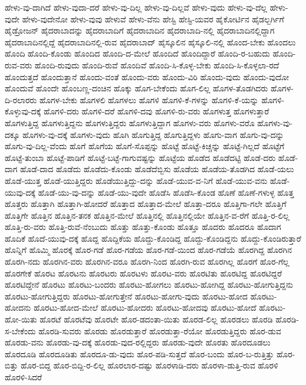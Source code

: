 {ಹೇಳು-ವು-ದಾಗಿದೆ
ಹೇಳು-ವುದಾ-ದರೆ
ಹೇಳು-ವು-ದಿಲ್ಲ
ಹೇಳು-ವು-ದಿಲ್ಲವೆ
ಹೇಳು-ವುದು
ಹೇಳು-ವು-ದೆಲ್ಲ
ಹೇಳು-ವುದೇ
ಹೇಳು-ವುದೇನೋ
ಹೇಳು-ವುವು
ಹೇಳುವೆ
ಹೇಳು-ವೆನು
ಹೇಸ್ಟಿ
ಹೇಸ್ಟಿ-ಯವರ
ಹೈಕೋರ್ಟಿನ
ಹೈಡಲ್ಬರ್ಗಿಗೆ
ಹೈಡ್ರೋಜನ್
ಹೈದರಾಬಾದನ್ನು
ಹೈದರಾಬಾದಿಗೆ
ಹೈದರಾಬಾದಿನ
ಹೈದರಾಬಾದಿ-ನಲ್ಲಿ
ಹೈದರಾಬಾದಿನಲ್ಲಿದ್ದಾಗ
ಹೈದರಾಬಾದಿನಲ್ಲಿದ್ದೆ
ಹೈದರಾಬಾದಿನಲ್ಲಿ-ರುವ
ಹೈದರಾಬಾದ್
ಹೈಸ್ಕೂಲಿನ
ಹೈಸ್ಕೂಲಿ-ನಲ್ಲಿ
ಹೊಂದ-ಬೇಕು
ಹೊಂದಲು
ಹೊಂದಿ
ಹೊಂದಿ-ಕೊಂಡು
ಹೊಂದಿದ
ಹೊಂದಿ-ದ-ಮೇಲೆ
ಹೊಂದಿದೆ
ಹೊಂದಿದ್ದಾರೆ
ಹೊಂದಿ-ರ-ಬಹುದು
ಹೊಂದಿ-ರುವ-ವರು
ಹೊಂದಿ-ರುವುದು
ಹೊಂದಿ-ರುವೆ
ಹೊಂದಿವೆ
ಹೊಂದಿ-ಸಿ-ಕೊಳ್ಳ-ಬೇಕು
ಹೊಂದಿ-ಸಿ-ಕೊಳ್ಳಲಾ-ರದೆ
ಹೊಂದುತ್ತದೆ
ಹೊಂದುತ್ತಾನೆ
ಹೊಂದು-ವಂತೆ
ಹೊಂದು-ವರು
ಹೊಂದು-ವಿರಿ
ಹೊಂದು-ವುದು
ಹೊಂದು-ವುದೋ
ಹೊಂದುವೆ
ಹೊಂದೇ
ಹೊಂಬಣ್ಣ-ದಂಚಿನ
ಹೊಕ್ಕು
ಹೊಗ-ಬೇಕೆಂದು
ಹೊಗ-ಲಿಲ್ಲ
ಹೊಗಳ-ತೊಡಗಿದರು
ಹೊಗಳ-ದಿ-ರಲಾರರು
ಹೊಗಳ-ಬೇಕು
ಹೊಗಳಲಿ
ಹೊಗಳಲು
ಹೊಗಳಿ
ಹೊಗಳಿ-ಕೆ-ಗಳನ್ನು
ಹೊಗಳಿ-ಕೆ-ಯನ್ನು
ಹೊಗಳಿ-ಕೊಳ್ಳುವು-ದಕ್ಕೆ
ಹೊಗಳಿ-ದರು
ಹೊಗಳಿ-ದರೆ
ಹೊಗಳಿ-ದವು
ಹೊಗಳಿ-ರು-ವರು
ಹೊಗಳುತ್ತ
ಹೊಗಳುತ್ತಾರೆ
ಹೊಗಳುತ್ತಿದ್ದ
ಹೊಗಳುತ್ತಿದ್ದನು
ಹೊಗಳುತ್ತಿದ್ದರು
ಹೊಗಳುತ್ತಿದ್ದಾಗ
ಹೊಗಳು-ವರು
ಹೊಗಳು-ವರೊ
ಹೊಗಳು-ವು-ದಕ್ಕೂ
ಹೊಗಳು-ವು-ದಕ್ಕೆ
ಹೊಗಳು-ವುದು
ಹೊಗಿ
ಹೊಗುತ್ತಿದ್ದ
ಹೊಗುತ್ತಿದ್ದಳು
ಹೊಗು-ವಾಗ
ಹೊಗು-ವು-ದನ್ನು
ಹೊಗು-ವು-ದಿಲ್ಲ-ವೆಂದು
ಹೊಗೆ
ಹೊಗೆಯ
ಹೊಗೆ-ಸೊಪ್ಪನ್ನು
ಹೊಟ್ಟೆ
ಹೊಟ್ಟೆ-ಕಿಚ್ಚನ್ನು
ಹೊಟ್ಟೆ-ಗಿಲ್ಲದೆ
ಹೊಟ್ಟೆಗೆ
ಹೊಟ್ಟೆ-ತುಂಬಾ
ಹೊಟ್ಟೆ-ಪಾಡಿಗೆ
ಹೊಟ್ಟೆ-ಬಟ್ಟೆ-ಗಾಗುವಷ್ಟನ್ನು
ಹೊಟ್ಟೆಯ
ಹೊಡೆದ
ಹೊಡೆದಟ್ಟಿ
ಹೊಡೆ-ದರು
ಹೊಡೆ-ದಾಗ
ಹೊಡೆ-ದಾದ
ಹೊಡೆದು
ಹೊಡೆದು-ಕೊಂಡು
ಹೊಡೆದೆಬ್ಬಿಸು
ಹೊಡೆಯ
ಹೊಡೆಯ-ತೊಡಗಿದ
ಹೊಡೆ-ಯಲು
ಹೊಡೆ-ಯುತ್ತ
ಹೊಡೆ-ಯುತ್ತಿದ್ದರು
ಹೊಡೆಯುತ್ತಿದ್ದು-ದನ್ನು
ಹೊಡೆ-ಯುವ-ವ-ನಿಗೆ
ಹೊಡೆ-ಯುವ-ವನು
ಹೊಡೆ-ಯುವು-ದಕ್ಕೆ
ಹೊಡೆ-ಯು-ವು-ದನ್ನು
ಹೊಡೆ-ಯು-ವುದೇ
ಹೊಡೆಸಿ
ಹೊಡೆಸಿ-ಕೊಂಡ
ಹೊಣೆ
ಹೊಣೆ-ಗಳುಳ್ಳ
ಹೊತ್ತ
ಹೊತ್ತರು
ಹೊತ್ತಾಗಿ
ಹೊತ್ತಾಗಿ-ಹೋದರೆ
ಹೊತ್ತಾದ
ಹೊತ್ತಾದ-ಮೇಲೆ
ಹೊತ್ತಾ-ದರೂ
ಹೊತ್ತಿಗಾ-ಗಲೇ
ಹೊತ್ತಿಗೆ
ಹೊತ್ತಿಗೇ
ಹೊತ್ತಿನ
ಹೊತ್ತಿನ-ತನಕ
ಹೊತ್ತಿನ-ಮೇಲೆ
ಹೊತ್ತಿನಲ್ಲಿ
ಹೊತ್ತಿನಲ್ಲಿಯೇ
ಹೊತ್ತಿನ-ವ-ರೆಗೆ
ಹೊತ್ತಿ-ರ-ಲಿಲ್ಲ
ಹೊತ್ತಿ-ರು-ವರು
ಹೊತ್ತಿ-ರುವೆ-ನೆಂಬುದು
ಹೊತ್ತು
ಹೊತ್ತು-ಕೊಂಡು
ಹೊತ್ತೂ
ಹೊದರು
ಹೊದರೂ
ಹೊದಾಗ
ಹೊದಿಕೆ
ಹೊದೆ-ಯುವು-ದಕ್ಕೆ
ಹೊದ್ದ
ಹೊದ್ದಿಕೆಯ
ಹೊದ್ದು-ಕೊಂಡಿದ್ದ
ಹೊದ್ದು-ಕೊಂಡಿದ್ದನು
ಹೊದ್ದು-ಕೊಂಡಿರುತ್ತಾರೆ
ಹೊನ್ನಿಗೆ
ಹೊಮ್ಮಿ
ಹೊರಕ್ಕೆ
ಹೊರ-ಗಡೆ
ಹೊರ-ಗಡೆಯ
ಹೊರ-ಗಡೆ-ಯಿಂದ
ಹೊರ-ಗಡೆಯೆ
ಹೊರಗಿದ್ದ
ಹೊರಗಿನ
ಹೊರಗಿ-ನದು
ಹೊರಗಿನ-ವರು
ಹೊರಗಿನ-ವರೂ
ಹೊರಗಿ-ನಿಂದ
ಹೊರಗಿ-ರುವ
ಹೊರಗಿಲ್ಲ
ಹೊರಗೆ
ಹೊರ-ಗೆಲ್ಲ
ಹೊರಗೇಕೆ
ಹೊರಟ
ಹೊರಟನು
ಹೊರಟರು
ಹೊರಟಳು
ಹೊರಟ-ವರು
ಹೊರಟಿತು
ಹೊರಟಿದ್ದ
ಹೊರಟಿದ್ದರೆ
ಹೊರಟಿದ್ದೇನೆ
ಹೊರಟು
ಹೊರಟು-ಬಂದರು
ಹೊರಟು-ಹೋಗಲು
ಹೊರಟು-ಹೋಗಿದ್ದ
ಹೊರಟು-ಹೋಗುತ್ತಿದ್ದನು
ಹೊರಟು-ಹೋಗುತ್ತಿದ್ದರು
ಹೊರಟು-ಹೋಗುತ್ತೇನೆ
ಹೊರಟು-ಹೋಗು-ವುದು
ಹೊರಟು-ಹೋದ
ಹೊರಟು-ಹೋದನು
ಹೊರಟು-ಹೋದ-ಮೇಲೆ
ಹೊರಟು-ಹೋದರು
ಹೊರಟು-ಹೋದವು
ಹೊರಟು-ಹೋದೆ
ಹೊರಟು-ಹೋ-ಯಿತು
ಹೊರಟೆ
ಹೊರಟೆವು
ಹೊರಟೇ
ಹೊರ-ಡದಂತಾ-ಯಿತು
ಹೊರಡ-ಲಿಲ್ಲ
ಹೊರಡಲು
ಹೊರಡಿ
ಹೊರಡಿ-ಸ-ಬೇಕೆಂದು
ಹೊರಡಿ-ಸುವರು
ಹೊರಡು
ಹೊರಡುತ್ತಾರೆ
ಹೊರಡುತ್ತಾ-ರೆಯೋ
ಹೊರಡುತ್ತಿದ್ದರು
ಹೊರ-ಡುವ
ಹೊರಡು-ವನು
ಹೊರಡು-ವು-ದಕ್ಕೆ
ಹೊರಡು-ವುದ-ರಲ್ಲಿದ್ದರು
ಹೊರಡು-ವುದೇ
ಹೊರತು
ಹೊರದೂಡಲು
ಹೊರದೂಡಿ
ಹೊರದೂಡಿತು
ಹೊರದೂ-ಡು-ವುದು
ಹೊರ-ಪಡಿ-ಸುತ್ತದೆ
ಹೊರ-ಬಂದು
ಹೊರ-ಬ-ರುತ್ತಿತ್ತು
ಹೊರ-ಬಿತ್ತು
ಹೊರ-ಬಿದ್ದ
ಹೊರ-ಬಿದ್ದಿ-ರ-ಲಿಲ್ಲ
ಹೊರಲಾರ-ದಷ್ಟು
ಹೊರಳಾಡಿ-ದರು
ಹೊರಳಾ-ಡುತ್ತಿ-ರುವ
ಹೊರಳಿ
ಹೊರಳಿ-ಸಿದರೆ
}
